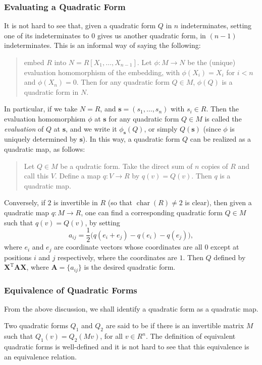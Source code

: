 \documentclass{article}
\newcommand{\bX}{\mathbf{X}}
\newcommand{\bs}{\mathbf{s}}
\newcommand{\bA}{\mathbf{A}}
\newcommand{\0}{\mathbf{0}}
\begin{document}
\subsubsection*{Evaluating a Quadratic Form}

It is not hard to see that, given a quadratic form $Q$ in $n$ indeterminates, setting one of its indeterminates to $0$ gives us another quadratic form, in $(n-1)$ indeterminates.  This is an informal way of saying the following: 
\begin{quote}
embed $R$ into $N=R[X_1,\ldots,X_{n-1}]$.  Let $\phi:M\to N$ be the (unique) evaluation homomorphism of the embedding, with $\phi(X_i)=X_i$ for $i<n$ and $\phi(X_n)=0$.  Then for any quadratic form $Q\in M$, $\phi(Q)$ is a quadratic form in $N$.
\end{quote}

In particular, if we take $N=R$, and $\bs=(s_1,\ldots,s_n)$ with $s_i\in R$.  Then the evaluation homomorphism $\phi$ at $\bs$ for any quadratic form $Q\in M$ is called the \emph{evaluation} of $Q$ at $\bs$, and we write it $\phi_{\bs}(Q)$, or simply $Q(\bs)$ (since $\phi$ is uniquely determined by $\bs$).  In this way, a quadratic form $Q$ can be realized as a quadratic map, as follows:
\begin{quote}
Let $Q\in M$ be a qudratic form.  Take the direct sum of $n$ copies of $R$ and call this $V$.  Define a map $q:V\to R$ by $q(v)=Q(v)$.  Then $q$ is a quadratic map.
\end{quote}

Conversely, if $2$ is invertible in $R$ (so that $\operatorname{char}(R)\ne 2$ is clear), then given a quadratic map $q:M\to R$, one can find a corresponding quadratic form $Q\in M$ such that $q(v)=Q(v)$, by setting $$a_{ij}=\frac{1}{2}\big(q(e_i+e_j)-q(e_i)-q(e_j)\big),$$ where $e_i$ and $e_j$ are coordinate vectors whose coordinates are all $0$ except at positions $i$ and $j$ respectively, where the coordinates are $1$.  Then $Q$ defined by ${\bX}^{\mathrm{T}} \bA \bX$, where $\bA=\lbrace a_{ij}\rbrace$ is the desired quadratic form.

\subsubsection*{Equivalence of Quadratic Forms}

From the above discussion, we shall identify a quadratic form as a quadratic map.

Two quadratic forms $Q_1$ and $Q_2$ are said to be \emph{} if there is an invertible matrix $M$ such that $Q_1(v)=Q_2(Mv)$, for all $v\in R^n$.  The definition of equivalent quadratic forms is well-defined and it is not hard to see that this equivalence is an equivalence relation.
\end{document}
